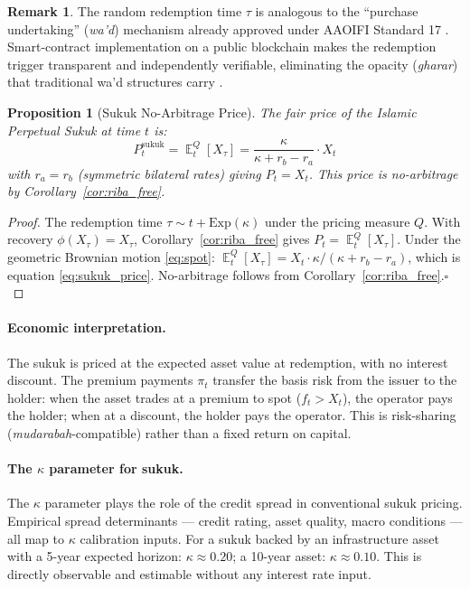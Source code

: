 \documentclass[10pt,twocolumn]{article}
\theoremstyle{plain}
\newtheorem{proposition}{Proposition}
\theoremstyle{definition}
\newtheorem{remark}{Remark}
\DeclareMathOperator{\E}{\mathbb{E}}
\begin{document}
\begin{remark}
The random redemption time $\tau$ is analogous to the
``purchase undertaking'' (\textit{wa'd}) mechanism already
approved under AAOIFI Standard 17 \cite{AAOIFI2017,AdamThomas2004}.
Smart-contract implementation on a public blockchain makes
the redemption trigger transparent and independently verifiable,
eliminating the opacity (\textit{gharar}) that traditional
wa'd structures carry \cite{TokenizedSukuk2022}.
\end{remark}

\begin{proposition}[Sukuk No-Arbitrage Price]
\label{prop:sukuk}
The fair price of the Islamic Perpetual Sukuk at time $t$ is:
\begin{equation}
P_t^{\mathrm{sukuk}} = \E^Q_t[X_\tau]
= \frac{\kappa}{\kappa + r_b - r_a}\cdot X_t
\label{eq:sukuk_price}
\end{equation}
with $r_a = r_b$ (symmetric bilateral rates) giving $P_t = X_t$.
This price is no-arbitrage by Corollary~\textup{\ref{cor:riba_free}}.
\end{proposition}

\begin{proof}
The redemption time $\tau \sim t + \mathrm{Exp}(\kappa)$ under
the pricing measure $Q$. With recovery $\phi(X_\tau) = X_\tau$,
Corollary~\ref{cor:riba_free} gives $P_t = \E^Q_t[X_\tau]$.
Under the geometric Brownian motion \eqref{eq:spot}:
$\E^Q_t[X_\tau] = X_t \cdot \kappa/(\kappa + r_b - r_a)$,
which is equation \eqref{eq:sukuk_price}. No-arbitrage follows
from Corollary~\ref{cor:riba_free}.\qquad$\square$
\end{proof}

\paragraph{Economic interpretation.}
The sukuk is priced at the expected asset value at redemption,
with no interest discount. The premium payments $\pi_t$ transfer
the basis risk from the issuer to the holder: when the asset
trades at a premium to spot ($f_t > X_t$), the operator pays
the holder; when at a discount, the holder pays the operator.
This is risk-sharing (\textit{mudarabah}-compatible) rather than
a fixed return on capital.

\paragraph{The $\kappa$ parameter for sukuk.}
The $\kappa$ parameter plays the role of the credit spread in
conventional sukuk pricing. Empirical spread determinants
\cite{Reboredo2021,Hassan2021} --- credit rating, asset quality,
macro conditions --- all map to $\kappa$ calibration inputs.
For a sukuk backed by an infrastructure asset with a 5-year
expected horizon: $\kappa \approx 0.20$; a 10-year asset:
$\kappa \approx 0.10$. This is directly observable and
estimable without any interest rate input.
\end{document}
